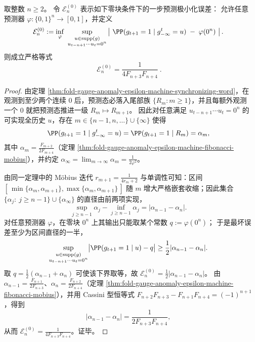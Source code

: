 \begin{theorem}\label{thm:fold-gauge-anomaly-zero-block-minimax-abs-error}
取整数 \(n\ge 2\)。
令 \(\mathcal E_n^{(0)}\) 表示如下零块条件下的一步预测极小化误差：
允许任意预测器 \(\varphi:\{0,1\}^n\to[0,1]\)，并定义
\[
\mathcal E_n^{(0)}
:=\inf_{\varphi}\ \sup_{\substack{u\in\operatorname{supp}(g)\\ u_{t-n+1}\cdots u_t=0^n}}
\left|\ \PP(g_{t+1}=1\mid g_{-\infty}^t=u)\;-\;\varphi(0^n)\ \right|.
\]
则成立严格等式
\[
\boxed{\ \mathcal E_n^{(0)}=\frac{1}{4F_{n+3}F_{n+4}}\ }.
\]
\end{theorem}
\begin{proof}
由定理 \ref{thm:fold-gauge-anomaly-epsilon-machine-synchronizing-word}，在观测到至少两个连续 \(0\) 后，预测态必落入尾部族 \(\{R_m:m\ge 1\}\)，并且每额外观测一个 \(0\) 就把预测态推进一级 \(R_m\mapsto R_{m+1}\)。
因此对任意满足 \(u_{t-n+1}\cdots u_t=0^n\) 的可实现全历史 \(u\)，存在 \(m\in\{n-1,n,\dots\}\cup\{\infty\}\) 使得
\[
\PP(g_{t+1}=1\mid g_{-\infty}^t=u)=\PP(g_{t+1}=1\mid R_m)=\alpha_m,
\]
其中 \(\alpha_m=\frac{F_{m+2}}{2F_{m+4}}\)（定理 \ref{thm:fold-gauge-anomaly-epsilon-machine-fibonacci-mobius}），并约定 \(\alpha_\infty=\lim_{m\to\infty}\alpha_m=\frac{1}{2\varphi^2}\)。
\par
由同一定理中的 Möbius 迭代 \(r_{m+1}=\frac{1}{4r_m+2}\) 与单调性可知：区间
\(
[\,\min\{\alpha_{m},\alpha_{m+1}\},\max\{\alpha_{m},\alpha_{m+1}\}\,]
\)
随 \(m\) 增大严格嵌套收缩；因此集合 \(\{\alpha_j:\ j\ge n-1\}\cup\{\alpha_\infty\}\) 的直径由前两项实现，
\[
\sup_{j\ge n-1}\alpha_j-\inf_{j\ge n-1}\alpha_j=|\alpha_{n-1}-\alpha_n|.
\]
对任意预测器 \(\varphi\)，在零块 \(0^n\) 上其输出只能取某个常数 \(q:=\varphi(0^n)\)；
于是最坏误差至少为区间直径的一半，
\[
\sup_{\substack{u\in\operatorname{supp}(g)\\ u_{t-n+1}\cdots u_t=0^n}}
\bigl|\PP(g_{t+1}=1\mid u)-q\bigr|
\ge \frac12|\alpha_{n-1}-\alpha_n|.
\]
取 \(q=\tfrac12(\alpha_{n-1}+\alpha_n)\) 可使该下界取等，故
\(
\mathcal E_n^{(0)}=\frac12|\alpha_{n-1}-\alpha_n|
\)。
由 \(\alpha_{n-1}=\frac{F_{n+1}}{2F_{n+3}}\)、\(\alpha_{n}=\frac{F_{n+2}}{2F_{n+4}}\)（定理 \ref{thm:fold-gauge-anomaly-epsilon-machine-fibonacci-mobius}），并用 Cassini 型恒等式
\(
F_{n+2}F_{n+3}-F_{n+1}F_{n+4}=(-1)^{n+1}
\)，得到
\[
|\alpha_{n-1}-\alpha_n|
=\frac{1}{2F_{n+3}F_{n+4}},
\]
从而 \(\mathcal E_n^{(0)}=\frac{1}{4F_{n+3}F_{n+4}}\)。证毕。
\end{proof}

